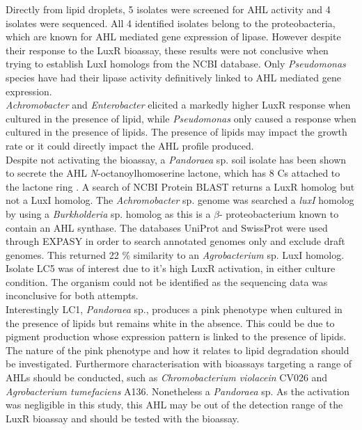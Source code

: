 \documentclass[11pt]{article}
\begin{document}
Directly from lipid droplets, 5 isolates were screened for AHL activity and 4 isolates were sequenced. All 4 identified isolates belong to the proteobacteria, which are known for AHL mediated gene expression of lipase. However despite their response to the LuxR bioassay, these results were not conclusive when trying to establish LuxI homologs from the NCBI database. Only \emph{Pseudomonas} species have had their lipase activity definitively linked to AHL mediated gene expression. \\

\emph{Achromobacter} and \emph{Enterobacter} elicited a markedly higher LuxR response when cultured in the presence of lipid, while \emph{Pseudomonas} only caused a response when cultured in the presence of lipids. The presence of lipids may impact the growth rate or it could directly impact the AHL profile produced. \\

Despite not activating the bioassay, a \emph{Pandoraea} sp. soil isolate has been shown to secrete the AHL \emph{N}-octanoylhomoserine lactone, which has 8 Cs attached to the lactone ring \cite{han2013pandoraea}. A search of NCBI Protein BLAST returns a LuxR homolog but not a LuxI homolog. The \emph{Achromobacter} sp. genome was searched a \emph{luxI} homolog by using a \emph{Burkholderia} sp. homolog as  this is a \emph{$\beta$}- proteobacterium known to contain an AHL synthase. The databases UniProt and SwissProt were used through EXPASY in order to search annotated genomes only and exclude draft genomes. This returned  22 \% similarity to an \emph{Agrobacterium} sp. LuxI homolog.\\

Isolate LC5 was of interest due to it's high LuxR activation, in either culture condition. The organism could not be identified as the sequencing data was inconclusive for both attempts.\\

Interestingly LC1, \emph{Pandoraea} sp., produces a pink phenotype when cultured in the presence of lipids but remains white in the absence. This could be due to pigment production whose expression pattern is linked to the presence of lipids. The nature of the pink phenotype and how it relates to lipid degradation should be investigated. 
Furthermore characterisation with bioassays targeting a range of AHLs should be conducted, such as \emph{Chromobacterium violacein} CV026 and \emph{Agrobacterium tumefaciens} A136.
Nonetheless a \emph{Pandoraea} sp.  As the activation was negligible in this study, this AHL may be out of the detection range of the LuxR bioassay and should be tested with the  bioassay.
\newpage
\end{document}
